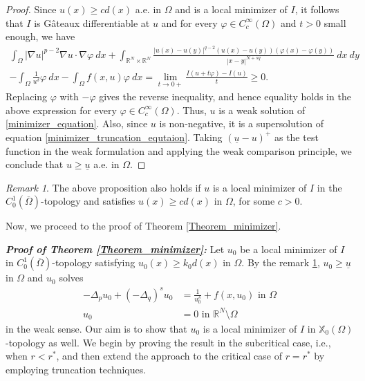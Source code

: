 \documentclass[reqno,oneside]{amsart}
\theoremstyle{definition}
\theoremstyle{remark}
\newtheorem{remark}[theorem]{Remark}
\numberwithin{equation}{section}
\newcommand{\Om} {\Omega}
\newcommand{\sr}{\mathbb{R}}
\newcommand{\p}{\Delta_p}
\newcommand{\qs}{(-\Delta_q)^s}
\newcommand{\bdry}{\mathbb{R}^N \setminus \Omega}
\newcommand{\rar}{\rightarrow}
\newcommand{\na} {\nabla}
\newcommand{\omc}{(\overline{\Om})}
\newcommand{\xo}{\mathbb{X}_0}
\newcommand{\ul}{\underline{u}}
\newcommand{\test}{C_c^{\infty} (\Om)}
\begin{document}
\begin{proof}
    Since $u(x) \geq c d(x)$ a.e. in $\Om$ and is a local minimizer of $I$, it follows that $I$ is G\^ateaux differentiable at $u$ and for every $\varphi\in\test$ and $t>0$ small enough, we have
    \begin{multline*}
        \int_{\Om} |\na u|^{p-2} \na u \cdot \na\varphi\ dx + \int_{\sr^N \times \sr^N} \frac{|u(x) - u(y)|^{q-2} \left(u(x) - u(y) \right) \left(\varphi(x) - \varphi(y) \right)}{|x-y|^{N+sq}}\ dx\ dy\\
        - \int_{\Om} \frac{1}{u^{\delta}} \varphi\ dx - \int_{\Om} f(x,u) \varphi\ dx = \lim_{t\rar 0+} \frac{I(u + t\varphi) - I(u)}{t} \geq 0.
    \end{multline*}
    Replacing $\varphi$ with $-\varphi$ gives the reverse inequality, and hence equality holds in the above expression for every $\varphi\in\test$. Thus, $u$ is a weak solution of \eqref{minimizer_equation}. Also, since $u$ is non-negative, it is a supersolution of equation \eqref{minimizer_truncation_equtaion}. Taking $\left( \ul-u \right)^+$ as the test function in the weak formulation and applying the weak comparison principle, we conclude that $u \geq \ul$ a.e. in $\Om$.
\end{proof}

\begin{remark}\label{minimizer_solution_remark}
    The above proposition also holds if $u$ is a local minimizer of $I$ in the $C^1_0 \omc$-topology and satisfies $u(x) \geq c d(x)$ in $\Om$, for some $c>0$.
\end{remark}

Now, we proceed to the proof of Theorem \ref{Theorem_minimizer}.
\vspace{5pt}

\noindent\textbf{\textit{Proof of Theorem \ref{Theorem_minimizer}:}} Let $u_0$ be a local minimizer of $I$ in $C^1_0 \omc$-topology satisfying $u_0 (x) \geq k_0 d(x)$ in $\Om$. By the remark \ref{minimizer_solution_remark}, $u_0 \geq \ul$ in $\Om$ and $u_0$ solves
\begin{equation}\label{u_0 equation}
    \begin{aligned}
        -\p u_0 + \qs u_0 &= \frac{1}{u_0^{\delta}} + f(x, u_0)  \text{ in } \Om\\
        u_0 &= 0 \text{ in } \bdry
    \end{aligned}
\end{equation}
in the weak sense. Our aim is to show that $u_0$ is a local minimizer of $I$ in $\xo(\Om)$-topology as well. We begin by proving the result in the subcritical case, i.e., when $r< r^*$, and then extend the approach to the critical case of $r=r^*$ by employing truncation techniques.
\vspace{5pt}
\end{document}

